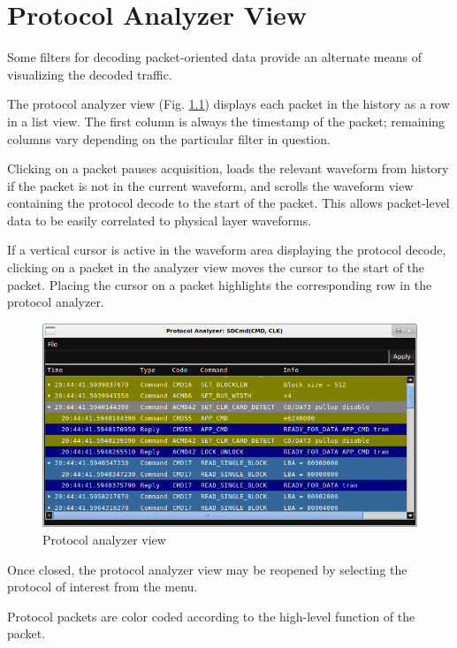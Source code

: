 \chapter{Protocol Analyzer View}

Some filters for decoding packet-oriented data provide an alternate means of visualizing the decoded traffic.

The protocol analyzer view (Fig. \ref{proto-analyzer}) displays each packet in the history as a row in a list view. The
first column is always the timestamp of the packet; remaining columns vary depending on the particular filter in
question.

Clicking on a packet pauses acquisition, loads the relevant waveform from history if the packet is not in the current
waveform, and scrolls the waveform view containing the protocol decode to the start of the packet. This allows
packet-level data to be easily correlated to physical layer waveforms.

If a vertical cursor is active in the waveform area displaying the protocol decode, clicking on a packet in the
analyzer view moves the cursor to the start of the packet. Placing the cursor on a packet highlights the corresponding
row in the protocol analyzer.

\begin{figure}[H]
\centering
\includegraphics[width=14cm]{images/proto-analyzer.png}
\caption{Protocol analyzer view}
\label{proto-analyzer}
\end{figure}

Once closed, the protocol analyzer view may be reopened by selecting the protocol of interest from the
 menu.

Protocol packets are color coded according to the high-level function of the packet.

